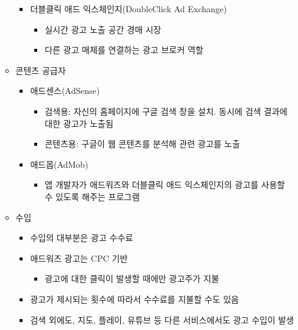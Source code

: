 \begin{itemize}
\begin{itemize}
\begin{itemize}
\begin{itemize}
			\end{itemize}
		\item 더블클릭 애드 익스체인지(DoubleClick Ad Exchange)
			\begin{itemize}
			\item 실시간 광고 노출 공간 경매 시장
			\item 다른 광고 매체를 연결하는 광고 브로커 역할
			\end{itemize}
		\end{itemize}
	\item 콘텐츠 공급자
		\begin{itemize}
		\item 애드센스(AdSense)
			\begin{itemize}
			\item 검색용: 자신의 홈페이지에 구글 검색 창을 설치. 동시에 검색 결과에 대한 광고가 노출됨
			\item 콘텐츠용: 구글이 웹 콘텐츠를 분석해 관련 광고를 노출
			\end{itemize}	
		\item 애드몹(AdMob)
			\begin{itemize}
			\item 앱 개발자가 애드워즈와 더블클릭 애드 익스체인지의 광고를 사용할 수 있도록 해주는 프로그램
			\end{itemize}
		\end{itemize}
	\item 수입
		\begin{itemize}
		\item 수입의 대부분은 광고 수수료
		\item 애드워즈 광고는 CPC 기반
			\begin{itemize}
			\item 광고에 대한 클릭이 발생할 때에만 광고주가 지불
			\end{itemize}
		\item 광고가 제시되는 횟수에 따라서 수수료를 지불할 수도 있음
		\item 검색 외에도, 지도, 플레이, 유튜브 등 다른 서비스에서도 광고 수입이 발생
		\end{itemize}
	\end{itemize}
\end{itemize}

